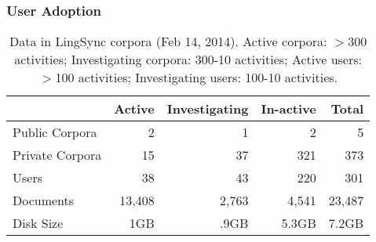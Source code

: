 \documentclass{beamer}
\begin{document}
\begin{frame}
\frametitle{User Adoption}
\begin{table}[h]
\begin{center}
\scriptsize
\begin{tabular}{lrrrr}
      \toprule
                     ~ &  Active & Investigating & In-active & Total\\
      \midrule
      Public Corpora  &       2 &   1 &   2 & 5 \\
      Private Corpora &      15 &  37 & 321 & 373\\
      Users           &      38 &  43 & 220 & 301 \\
      Documents & 13,408 & 2,763 & 4,541 &23,487\\
      Disk Size & 1GB & .9GB & 5.3GB& 7.2GB\\

      \bottomrule

\end{tabular}
\caption{Data in LingSync corpora (Feb 14, 2014). Active corpora: $>$300
activities; Investigating corpora: 300-10 activities; Active users: $>$100
activities; Investigating users: 100-10 activities.}
\label{lingsync-data}
 \end{center}
 \normalsize
\end{table}

\end{frame}
\end{document}

